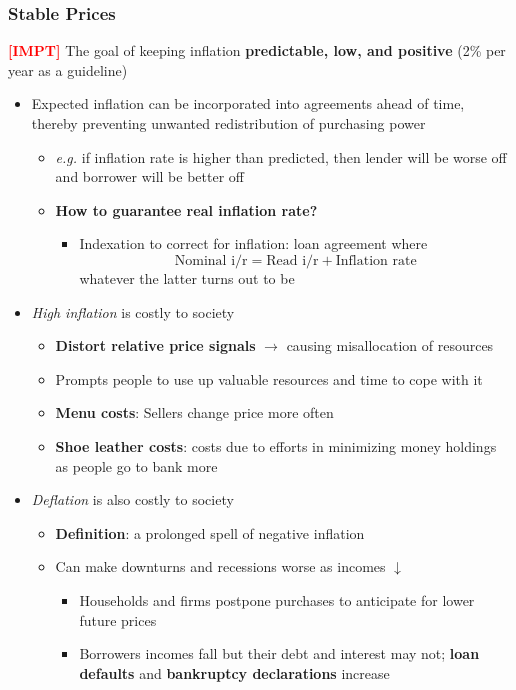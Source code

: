 \documentclass{article}
\newcommand{\eg}[0]{\textit{e.g. }}
\newcommand{\impt}[0]{\textcolor{red}{\textbf{[IMPT] }}}
\begin{document}
\begin{multicols}{2}
\subsubsection{Stable Prices}
\impt The goal of keeping inflation \textbf{predictable, low, and positive} (2\% per year as a guideline)
\begin{itemize}
	\item Expected inflation can be incorporated into agreements ahead of time, thereby preventing unwanted redistribution of purchasing power
	\begin{itemize}
		\item \eg if inflation rate is higher than predicted, then lender will be worse off and borrower will be better off
		\item \textbf{How to guarantee real inflation rate?}
		\begin{itemize}
			\item Indexation to correct for inflation: loan agreement where
			$$\text{Nominal i/r} = \text{Read i/r} + \text{Inflation rate}$$
			whatever the latter turns out to be
		\end{itemize}
	\end{itemize}
    \item \textit{High inflation} is costly to society
    \begin{itemize}
    	\item \textbf{Distort relative price signals} $\rightarrow$ causing misallocation of resources
    	\item Prompts people to use up valuable resources and time to cope with it
    	\item \textbf{Menu costs}: Sellers change price more often
    	\item \textbf{Shoe leather costs}: costs due to efforts in minimizing money holdings as people go to bank more
    \end{itemize}
    \item \textit{Deflation} is also costly to society
    \begin{itemize}
    	\item \textbf{Definition}: a prolonged spell of negative inflation
    	\item Can make downturns and recessions worse as incomes $\downarrow$
    	\begin{itemize}
    		\item Households and firms postpone purchases to anticipate for lower future prices
    		\item Borrowers incomes fall but their debt and interest may not; \textbf{loan defaults} and \textbf{bankruptcy declarations} increase
    	\end{itemize}
    \end{itemize}
\end{itemize}


\end{multicols}
\end{document}
